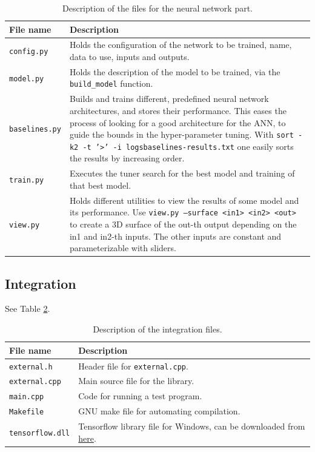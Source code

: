 \begin{table}[h]
    \centering
    \begin{tabular}{|p{}|p{}|}
        \hline
        File name & Description \\ \hline
        \texttt{config.py} & Holds the configuration of the network to be trained, name, data to use, inputs and outputs. \\
        \texttt{model.py} & Holds the description of the model to be trained, via the \texttt{build\_model} function. \\
        \texttt{baselines.py} & Builds and trains different, predefined neural network architectures, and stores their performance. This eases the process of looking for a good architecture for the ANN, to guide the bounds in the hyper-parameter tuning. With \texttt{sort -k2 -t '>' -i logs\/baselines-results.txt} one easily sorts the results by increasing order. \\
        \texttt{train.py} & Executes the tuner search for the best model and training of that best model. \\
        \texttt{view.py} & Holds different utilities to view the results of some model and its performance. Use \texttt{view.py --surface <in1> <in2> <out>} to create a 3D surface of the out-th output depending on the in1 and in2-th inputs. The other inputs are constant and parameterizable with sliders. \\
        \hline
    \end{tabular}
    \caption{Description of the files for the neural network part.}
    \label{tab:annex-files-nn}
\end{table}

\subsection{Integration}

See Table \ref{tab:annex-files-integration}.

\begin{table}[h]
    \centering
    \begin{tabular}{|p{}|p{}|}
        \hline
        File name & Description \\ \hline
        \texttt{external.h} & Header file for \texttt{external.cpp}. \\
        \texttt{external.cpp} & Main source file for the library. \\
        \texttt{main.cpp} & Code for running a test program. \\
        \texttt{Makefile} & GNU make file for automating compilation. \\
        \texttt{tensorflow.dll} & Tensorflow library file for Windows, can be downloaded from \href{https://www.tensorflow.org/install/lang_c}{here}. \\
        \hline
    \end{tabular}
    \caption{Description of the integration files.}
    \label{tab:annex-files-integration}
\end{table}

